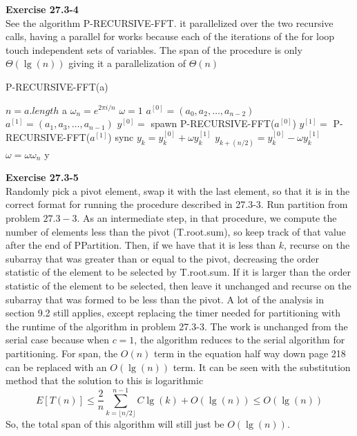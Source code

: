 \documentclass{article}
\begin{document}
\noindent\textbf{Exercise 27.3-4}\\

See the algorithm P-RECURSIVE-FFT. it parallelized over the two recursive calls, having a parallel for works because each of the iterations of the for loop touch independent sets of variables. The span of the procedure is only $\Theta(\lg(n))$ giving it a parallelization of $\Theta(n)$

\begin{algorithm}
\caption{P-RECURSIVE-FFT(a)}
\begin{algorithmic}
\State $n = a.length$
\State \Return a
\EndIf
\State $\omega_n = e^{2\pi i/n}$
\State $\omega =1$
\State $a^{[0]} = (a_0,a_2, \ldots, a_{n-2})$
\State $a^{[1]} = (a_1,a_3, \ldots, a_{n-1})$
\State $y^{[0]} =$ spawn P-RECURSIVE-FFT($a^{[0]}$)
\State $y^{[1]} =$ P-RECURSIVE-FFT($a^{[1]}$)
\State sync
\State $y_k = y_k^{[0]} + \omega y_k^{[1]}$
\State $y_{k+ (n/2)} = y_k^{[0]} - \omega y_k^{[1]}$
\State $\omega = \omega \omega_n$
\EndParFor
\State \Return y
\end{algorithmic}
\end{algorithm}

\noindent\textbf{Exercise 27.3-5}\\

Randomly pick a pivot element, swap it with the last element, so that it is in the correct format for running the procedure described in 27.3-3.
Run partition from problem $27.3-3$. As an intermediate step, in that procedure, we compute the number of elements less than the pivot (T.root.sum), so keep track of that value after the end of PPartition. Then, if we have that it is less than $k$, recurse on the subarray that was greater than or equal to the pivot, decreasing the order statistic of the element to be selected by T.root.sum. If it is larger than the order statistic of the element to be selected, then leave it unchanged and recurse on the subarray that was formed to be less than the pivot. A lot of the analysis in section 9.2 still applies, except replacing the timer needed for partitioning with the runtime of the algorithm in problem 27.3-3. The work is unchanged from the serial case because when $c=1$, the algorithm reduces to the serial algorithm for partitioning. For span, the $O(n)$ term in the equation half way down page 218 can be replaced with an $O(\lg(n))$ term. It can be seen with the substitution method that the solution to this is logarithmic
\[
E[T(n)] \le \frac{2}{n} \sum_{k=\lfloor n/2\rfloor}^{n-1} C \lg(k) + O(\lg(n)) \le O(\lg(n)) 
\]
So, the total span of this algorithm will still just be $O(\lg(n))$.\\
\end{document}
